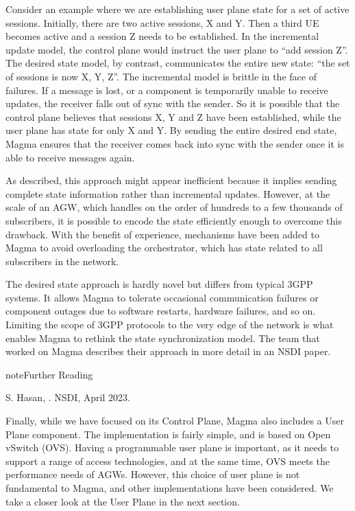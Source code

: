 \documentclass[a4paper,11pt,english]{sphinxmanual}
\begin{document}
\sphinxAtStartPar
Consider an example where we are establishing user plane state for a set
of active sessions. Initially, there are two active sessions, X
and Y. Then a third UE becomes active and a session Z needs to be
established. In the incremental update model, the control plane would
instruct the user plane to “add session Z”. The desired state model,
by contrast, communicates the entire new state: “the set of sessions
is now X, Y, Z”. The incremental model is brittle in the face of
failures. If a message is lost, or a component is temporarily unable
to receive updates, the receiver falls out of sync with the sender. So
it is possible that the control plane believes that sessions X, Y and
Z have been established, while the user plane has state for only X
and Y. By sending the entire desired end state, Magma ensures that the
receiver comes back into sync with the sender once it is able to
receive messages again.

\sphinxAtStartPar
As described, this approach might appear inefficient because it
implies sending complete state information rather than incremental
updates. However, at the scale of an AGW, which handles on the order
of hundreds to a few thousands of subscribers, it is possible to encode the
state efficiently enough to overcome this drawback. With the benefit
of experience, mechanisms have been added to Magma to avoid overloading the
orchestrator, which has state related to all subscribers in the
network.

\sphinxAtStartPar
The desired state approach is hardly novel but differs from typical
3GPP systems.  It allows Magma to tolerate occasional communication
failures or component outages due to software restarts, hardware
failures, and so on. Limiting the scope of 3GPP protocols to the very
edge of the network is what enables Magma to rethink the state
synchronization model. The team that worked on Magma describes their
approach in more detail in an NSDI paper.

\label{\detokenize{core:reading-magma}}
\begin{sphinxadmonition}{note}{Further Reading}

\sphinxAtStartPar
S. Hasan,  .
NSDI, April 2023.
\end{sphinxadmonition}

\sphinxAtStartPar
Finally, while we have focused on its Control Plane, Magma also
includes a User Plane component. The implementation is fairly simple,
and is based on Open vSwitch (OVS). Having a programmable user plane
is important, as it needs to support a range of access technologies, and
at the same time, OVS meets the performance needs of AGWs. However,
this choice of user plane is not fundamental to Magma, and other
implementations have been considered. We take a closer look at the
User Plane in the next section.
\end{document}
